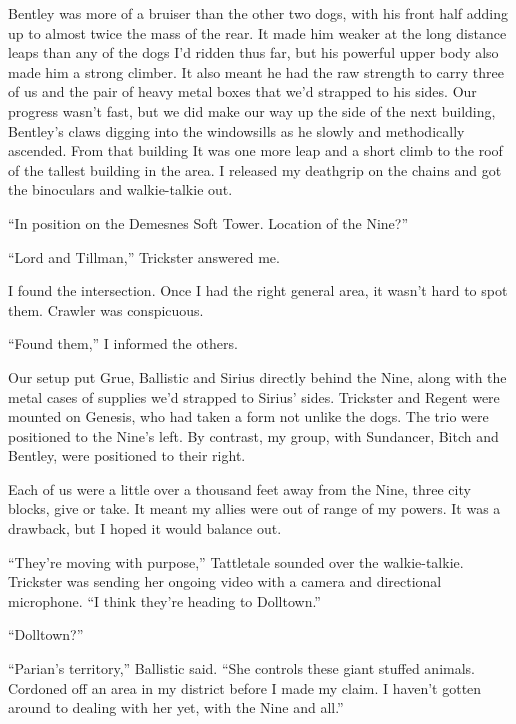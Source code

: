 Bentley was more of a bruiser than the other two dogs, with his front half adding up to almost twice the mass of the rear.  It made him weaker at the long distance leaps than any of the dogs I'd ridden thus far, but his powerful upper body also made him a strong climber.  It also meant he had the raw strength to carry three of us and the pair of heavy metal boxes that we'd strapped to his sides.  Our progress wasn't fast, but we did make our way up the side of the next building, Bentley's claws digging into the windowsills as he slowly and methodically ascended.  From that building It was one more leap and a short climb to the roof of the tallest building in the area.  I released my deathgrip on the chains and got the binoculars and walkie-talkie out.



``In position on the Demesnes Soft Tower.  Location of the Nine?''



``Lord and Tillman,'' Trickster answered me.



I found the intersection.  Once I had the right general area, it wasn't hard to spot them.  Crawler was conspicuous.



``Found them,'' I informed the others.



Our setup put Grue, Ballistic and Sirius directly behind the Nine, along with the metal cases of supplies we'd strapped to Sirius' sides.  Trickster and Regent were mounted on Genesis, who had taken a form not unlike the dogs.  The trio were positioned to the Nine's left.  By contrast, my group, with Sundancer, Bitch and Bentley, were positioned to their right.



Each of us were a little over a thousand feet away from the Nine, three city blocks, give or take.  It meant my allies were out of range of my powers.  It was a drawback, but I hoped it would balance out.



``They're moving with purpose,'' Tattletale sounded over the walkie-talkie.  Trickster was sending her ongoing video with a camera and directional microphone.  ``I think they're heading to Dolltown.''



``Dolltown?''



``Parian's territory,'' Ballistic said.  ``She controls these giant stuffed animals.  Cordoned off an area in my district before I made my claim.  I haven't gotten around to dealing with her yet, with the Nine and all.''



